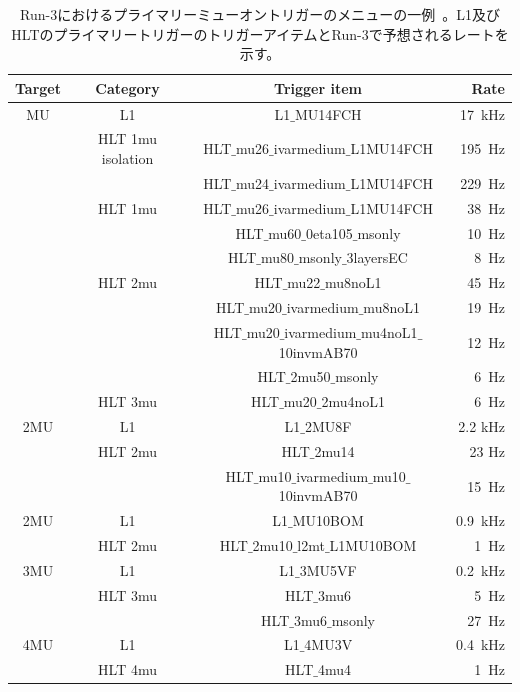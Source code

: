 \begin{table}[]
    \caption{Run-3におけるプライマリーミューオントリガーのメニューの一例~\cite{article:Run3trigmenu}。L1及びHLTのプライマリートリガーのトリガーアイテムとRun-3で予想されるレートを示す。}
    \label{triigermenu}
    \centering
    \begin{tabular}{|c|c|c|r|}
    \hline
        Target & Category & Trigger item & Rate\\
        \hline
        MU  & L1 & L1$\_$MU14FCH & 17~kHz\\
        \hline
            &HLT 1mu isolation & HLT$\_$mu26$\_$ivarmedium$\_$L1MU14FCH & 195~Hz\\
            &        & HLT$\_$mu24$\_$ivarmedium$\_$L1MU14FCH & 229~Hz\\
        \hline
            &HLT 1mu& HLT$\_$mu26$\_$ivarmedium$\_$L1MU14FCH & 38~Hz\\
            &       & HLT$\_$mu60$\_$0eta105$\_$msonly & 10~Hz\\
            &       & HLT$\_$mu80$\_$msonly$\_$3layersEC & 8~Hz\\
        \hline
            &HLT 2mu & HLT$\_$mu22$\_$mu8noL1 & 45~Hz\\
            &       & HLT$\_$mu20$\_$ivarmedium$\_$mu8noL1 & 19~Hz\\
            &       & HLT$\_$mu20$\_$ivarmedium$\_$mu4noL1$\_$10invmAB70 & 12~Hz\\
            &       & HLT$\_$2mu50$\_$msonly & 6~Hz\\
        \hline
            &HLT 3mu    & HLT$\_$mu20$\_$2mu4noL1 & 6~Hz\\
        \hline
        \hline
        2MU & L1        & L1$\_$2MU8F & 2.2 kHz\\
        \hline
            & HLT 2mu   & HLT$\_$2mu14 & 23 Hz\\
            &           & HLT$\_$mu10$\_$ivarmedium$\_$mu10$\_$10invmAB70 & 15~Hz\\
        \hline
        \hline
        2MU & L1 & L1$\_$MU10BOM & 0.9~kHz\\
        \hline
            & HLT 2mu & HLT$\_$2mu10$\_$l2mt$\_$L1MU10BOM & 1~Hz\\
        \hline
        \hline
        3MU &L1 & L1$\_$3MU5VF & 0.2~kHz\\
        \hline
            &HLT 3mu & HLT$\_$3mu6 & 5~Hz\\
            &        &HLT$\_$3mu6$\_$msonly &27~Hz\\
        \hline
        \hline
        4MU & L1 & L1$\_$4MU3V & 0.4~kHz\\
        \hline
            & HLT 4mu & HLT$\_$4mu4 & 1~Hz\\
        \hline
    \end{tabular}
\end{table}



